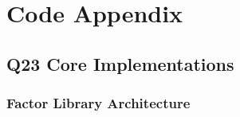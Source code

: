 \documentclass[11pt,letterpaper,openany]{book}
\newcommand{\argmax}{\operatorname{arg\,max}}
\begin{document}
% 
% 
% 
% 
% 
% 
% 
% 
% 
% 
% 
% 
% 
% 
% 
\chapter{Code Appendix}

\section{Q23 Core Implementations}

\subsection{Factor Library Architecture}
\end{document}
